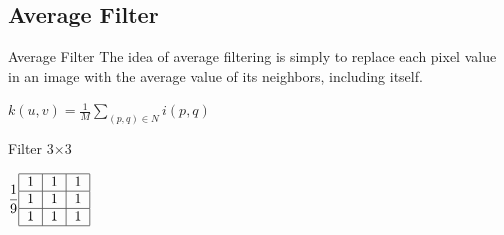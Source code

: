 \documentclass{beamer}
\begin{document}
\subsection{Average Filter}
\begin{frame}{Average Filter}
The idea of average filtering is simply to replace each pixel value in an image with the average value of its neighbors, including itself.

\begin{center}
$k(u,v) = \frac{1}{M}\displaystyle\sum_{(p,q) \in N} i(p,q)$
\end{center}
\vspace{0.5cm}


\begin{center}


	Filter 3$\times$3
	
	$\dfrac{1}{9}\begin{tabular}{|c|c|c|}
	\hline 
	1 & 1 & 1 \\ 
	\hline 
	1 & 1 & 1 \\ 
	\hline 
	1 & 1 & 1 \\ 
	\hline 
	\end{tabular}$ 	
\end{center}





\end{frame}
\end{document}
